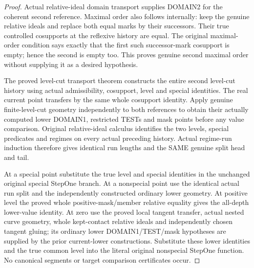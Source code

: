 \begin{proof}
Actual relative-ideal domain transport supplies DOMAIN2 for the coherent
second reference. Maximal order also follows internally: keep the genuine
relative ideals and replace both equal marks by their successors. Their
true controlled cosupports at the reflexive history are equal. The original
maximal-order condition says exactly that the first such successor-mark
cosupport is empty; hence the second is empty too. This proves genuine
second maximal order without supplying it as a desired hypothesis.

The proved level-cut transport theorem constructs the entire second
level-cut history using actual admissibility, cosupport, level and special
identities. The real current point transfers by the same whole cosupport
identity. Apply genuine finite-level-cut geometry independently to both
references to obtain their actually computed lower DOMAIN1, restricted
TESTs and mask points before any value comparison. Original relative-ideal
calculus identifies the two levels, special predicates and regimes on
every actual preceding history. Actual regime-run induction therefore
gives identical run lengths and the SAME genuine split head and tail.

At a special point substitute the true level and special identities in
the unchanged original special StepOne branch. At a nonspecial point use
the identical actual run split and the independently constructed ordinary
lower geometry. At positive level the proved whole positive-mask/member
relative equality gives the all-depth lower-value identity. At zero use
the proved local tangent transfer, actual nested curve geometry, whole
kept-contact relative ideals and independently chosen tangent gluing;
its ordinary lower DOMAIN1/TEST/mask hypotheses are supplied by the prior
current-lower constructions. Substitute these lower identities and the
true common level into the literal original nonspecial StepOne function.
No canonical segments or target comparison certificates occur.
\end{proof}

